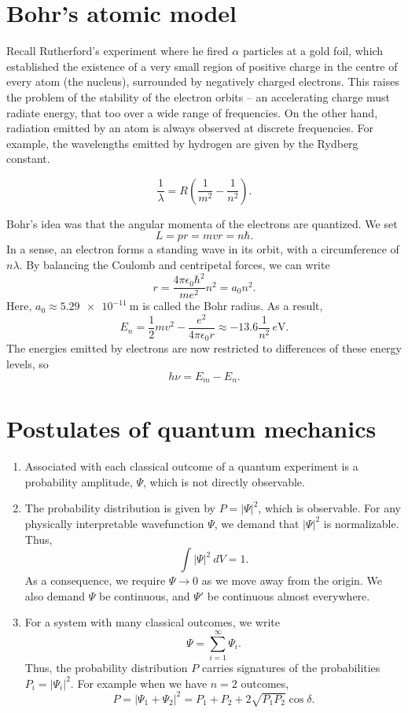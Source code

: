 \documentclass[11pt]{article}
\theoremstyle{definition}
\newenvironment{boxedeq}%
    {\begin{equationbox}\begin{equation}}%
    {\end{equation}\end{equationbox}}
\theoremstyle{remark}
\numberwithin{equation}{section}
\begin{document}
    \section{Bohr's atomic model}
    Recall Rutherford's experiment where he fired $\alpha$ particles at a gold
    foil, which established the existence of a very small region of positive charge
    in the centre of every atom (the nucleus), surrounded by negatively charged
    electrons. This raises the problem of the stability of the electron orbits -- an
    accelerating charge must radiate energy, that too over a wide range of
    frequencies. On the other hand, radiation emitted by an atom is always observed
    at discrete frequencies. For example, the wavelengths emitted by hydrogen are 
    given by the Rydberg constant.
    \begin{boxedeq}
        \frac{1}{\lambda} = R\left(\frac{1}{m^2} - \frac{1}{n^2}\right).
    \end{boxedeq}
    Bohr's idea was that the angular momenta of the electrons are quantized. We set
    \[
        L = pr = mvr = n\hbar.
    \] In a sense, an electron forms a standing wave in its orbit, with a
    circumference of $n\lambda$. By balancing the Coulomb and centripetal forces, we
    can write \[
        r = \frac{4\pi\epsilon_0 \hbar^2}{me^2}n^2 = a_0n^2.
    \] Here, $a_0 \approx \SI{5.29e-11}{\meter}$ is called the Bohr radius.
    As a result, \[
        E_n = \frac{1}{2}mv^2 - \frac{e^2}{4\pi\epsilon_0 r} 
            \approx -13.6 \frac{1}{n^2}\,\si{e\volt}.
    \] The energies emitted by electrons are now restricted to differences of these
    energy levels, so \[
        h\nu = E_m - E_n.
    \] 

    \section{Postulates of quantum mechanics}
    \begin{enumerate}
        \item Associated with each classical outcome of a quantum experiment is a
        probability amplitude, $\Psi$, which is not directly observable.
        \item The probability distribution is given by $P = |\Psi|^2$, which is
        observable. For any physically interpretable wavefunction $\Psi$, we demand
        that $|\Psi|^2$ is normalizable. Thus, \[
            \int |\Psi|^2 \:dV = 1.
        \] As a consequence, we require $\Psi \to 0$ as we move away from the
        origin. We also demand $\Psi$ be continuous, and $\Psi'$ be continuous
        almost everywhere.
        \item For a system with many classical outcomes, we write \[
            \Psi = \sum_{i = 1}^\infty \Psi_i.
        \] Thus, the probability distribution $P$ carries signatures of the
        probabilities $P_i = |\Psi_i|^2$. For example when we have $n = 2$ 
        outcomes, \[
            P = |\Psi_1 + \Psi_2|^2 = P_1 + P_2 + 2\sqrt{P_1P_2}\cos\delta.
        \] 
    \end{enumerate}
\end{document}
